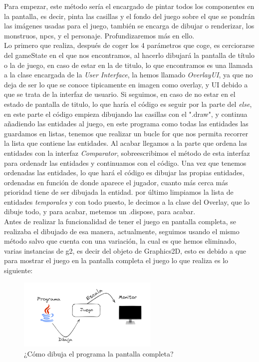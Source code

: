 \documentclass[a4paper]{article}
\begin{document}
Para empezar, este método sería el encargado de pintar todos los componentes en la pantalla, es decir, pinta las casillas y el fondo del juego sobre el que se pondrán las imágenes usadas para el juego,
también se encarga de dibujar o renderizar, los monstruos, npcs, y el personaje. Profundizaremos más en ello.\\
Lo primero que realiza, después de coger los 4 parámetros que coge, es cerciorarse del gameState en el que nos encontramos, al hacerlo dibujará la pantalla de título o la de juego, en caso de estar en la
de titulo, lo que encontramos es una llamada a la clase encargada de la \textit{User Interface}, la hemos llamado \textit{OverlayUI}, ya que no deja de ser lo que se conoce tipicamente en imagen como overlay,
y UI debido a que se trata de la interfaz de usuario. Si seguimos, en caso de no estar en el estado de pantalla de titulo, lo que haría el código es seguir por la parte del \textit{else}, en este parte el código empieza
dibujando las casillas con el ".draw", y continua añadiendo las entidades al juego, en este programa como todas las entidades las guardamos en listas, tenemos que realizar un bucle for que nos permita recorrer la lista
que contiene las entidades. Al acabar llegamos a la parte que ordena las entidades con la interfaz \textit{Comparator}, sobreescribimos el método de esta interfaz para ordenadr las entidades y continuamos con el código.
Una vez que tenemos ordenadas las entidades, lo que hará el código es dibujar las propias entidades, ordenadas en función de donde aparece el jugador, cuanto más cerca más prioridad tiene de ser dibujada la entidad.
por último limpiamos la lista de entidades \textit{temporales} y con todo puesto, le decimos a la clase del Overlay, que lo dibuje todo, y para acabar, metemos un .dispose, para acabar. \\
Antes de realizar la funcionalidad de tener el juego en pantalla completa, se realizaba el dibujado de esa manera, actualmente, seguimos usando el mismo método salvo que cuenta con una variación, la cual es que hemos eliminado,
varias instancias de g2, es decir del objeto de Graphics2D, esto es debido a que para mostrar el juego en la pantalla completa el juego lo que realiza es lo siguiente:\\
\begin{figure}[ht]
    \centering
    \includegraphics[width=0.6\textwidth]{Images/Fullscrennmode.PNG}
    \caption{¿Cómo dibuja el programa la pantalla completa?}
    \label{fig:fullscreen}
\end{figure}
\end{document}

